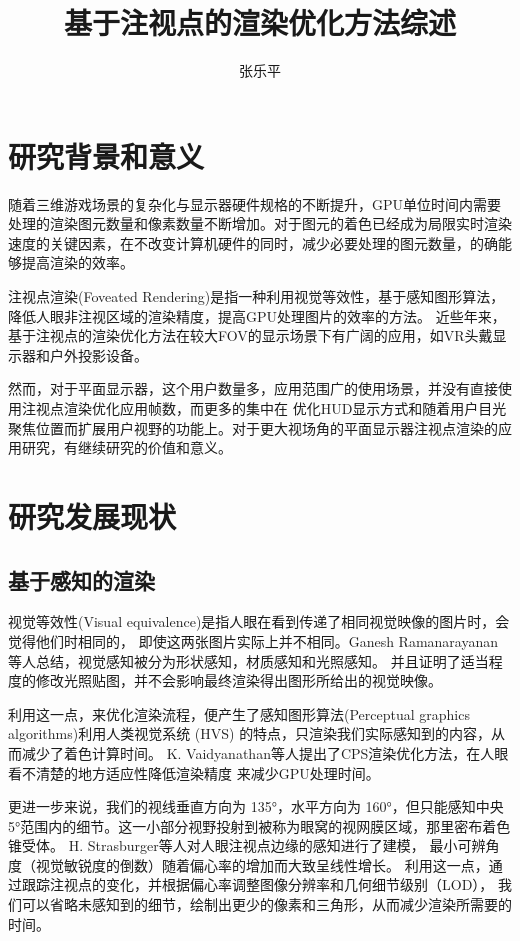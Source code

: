 \documentclass[]{ctexart}
\title{基于注视点的渲染优化方法综述}
\author{张乐平}
\begin{document}
	\maketitle
	\section{研究背景和意义}
	随着三维游戏场景的复杂化与显示器硬件规格的不断提升，GPU单位时间内需要处理的渲染图元数量和像素数量不断增加。对于图元的着色已经成为局限实时渲染速度的关键因素，在不改变计算机硬件的同时，减少必要处理的图元数量，的确能够提高渲染的效率。
	
	注视点渲染(Foveated Rendering)是指一种利用视觉等效性，基于感知图形算法，降低人眼非注视区域的渲染精度，提高GPU处理图片的效率的方法。
	近些年来，基于注视点的渲染优化方法在较大FOV的显示场景下有广阔的应用，如VR头戴显示器和户外投影设备。
	
	然而，对于平面显示器，这个用户数量多，应用范围广的使用场景，并没有直接使用注视点渲染优化应用帧数，而更多的集中在
	优化HUD显示方式和随着用户目光聚焦位置而扩展用户视野的功能上。对于更大视场角的平面显示器注视点渲染的应用研究，有继续研究的价值和意义。
	
	\section{研究发展现状}
	
	
		\subsection{基于感知的渲染}
		视觉等效性(Visual equivalence)是指人眼在看到传递了相同视觉映像的图片时，会觉得他们时相同的，
		即使这两张图片实际上并不相同。Ganesh Ramanarayanan等人\cite{Ramanarayanan2007VisualET}总结，视觉感知被分为形状感知，材质感知和光照感知。
		并且证明了适当程度的修改光照贴图，并不会影响最终渲染得出图形所给出的视觉映像。
		
		利用这一点，来优化渲染流程，便产生了感知图形算法(Perceptual graphics algorithms)利用人类视觉系统 (HVS) 的特点，只渲染我们实际感知到的内容，从而减少了着色计算时间\cite{Guenter2012Foveated3G}。
		K. Vaidyanathan等人\cite{Vaidyanathan2014CoarsePS}提出了CPS渲染优化方法，在人眼看不清楚的地方适应性降低渲染精度
		来减少GPU处理时间。
		
		更进一步来说，我们的视线垂直方向为 135°，水平方向为 160°，但只能感知中央 5°范围内的细节。这一小部分视野投射到被称为眼窝的视网膜区域，那里密布着色锥受体\cite{Guenter2012Foveated3G}\cite{10.1145/355017.355033}。
		H. Strasburger等人对人眼注视点边缘的感知进行了建模\cite{Strasburger2011PeripheralVA}，
		最小可辨角度（视觉敏锐度的倒数）随着偏心率的增加而大致呈线性增长。
		利用这一点，通过跟踪注视点的变化，并根据偏心率调整图像分辨率和几何细节级别（LOD），
		我们可以省略未感知到的细节，绘制出更少的像素和三角形，从而减少渲染所需要的时间。
		
\end{document}
